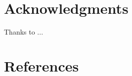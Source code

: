 \documentclass[authoryear,preprint,review,12pt]{elsarticle}
\begin{document}
\section{Acknowledgments}
\label{sec_acknowledgments}

Thanks to ...




\section{References}
\label{sec_reference}

 
%



%
%
\end{document}
